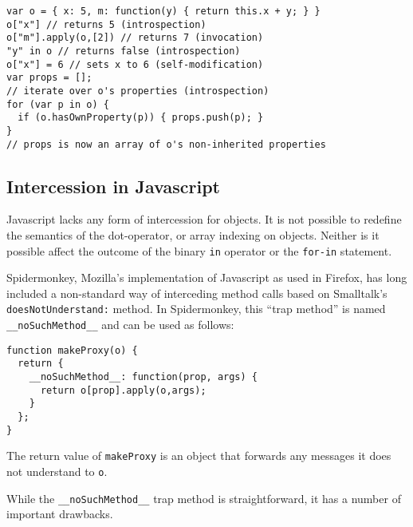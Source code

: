 \documentclass{acm_proc_article-sp}
\begin{document}
\begin{lstlisting}
var o = { x: 5, m: function(y) { return this.x + y; } }
o["x"] // returns 5 (introspection)
o["m"].apply(o,[2]) // returns 7 (invocation)
"y" in o // returns false (introspection)
o["x"] = 6 // sets x to 6 (self-modification)
var props = [];
// iterate over o's properties (introspection)
for (var p in o) {
  if (o.hasOwnProperty(p)) { props.push(p); }
}
// props is now an array of o's non-inherited properties
\end{lstlisting}

\subsection{Intercession in Javascript}
\label{sub:intercession_in_javascript}

Javascript lacks any form of intercession for objects. It is not possible to redefine the semantics of the dot-operator, or array indexing on objects. Neither is it possible affect the outcome of the binary \texttt{in} operator or the \texttt{for-in} statement.

Spidermonkey, Mozilla's implementation of Javascript as used in Firefox, has long included a non-standard way of interceding method calls based on Smalltalk's \texttt{doesNotUnderstand:} method. In Spidermonkey, this ``trap method'' is named \lstinline{__noSuchMethod__} and can be used as follows:

\begin{lstlisting}
function makeProxy(o) {
  return {
    __noSuchMethod__: function(prop, args) {
      return o[prop].apply(o,args);
    }
  };
}
\end{lstlisting}

The return value of \texttt{makeProxy} is an object that forwards any messages it does not understand to \texttt{o}.

While the \lstinline{__noSuchMethod__} trap method is straightforward, it has a number of important drawbacks.
\end{document}
